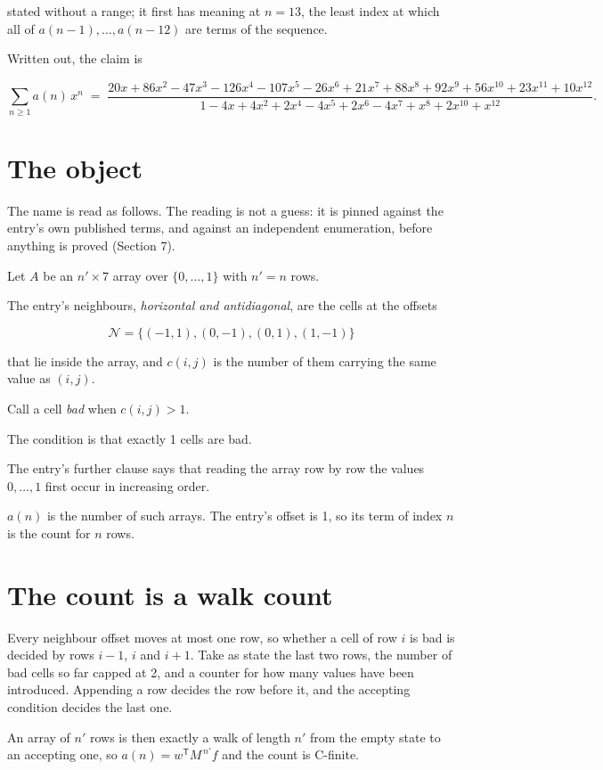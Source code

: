 \documentclass[11pt]{article}
\theoremstyle{definition}
\begin{document}
stated without a range; it first has meaning at $n = 13$, the least index at which all of $a(n-1),\dots,a(n-12)$ are terms of the sequence.

Written out, the claim is

\[\sum_{n \ge 1} a(n)\,x^n \;=\; \frac{20x + 86x^{2} - 47x^{3} - 126x^{4} - 107x^{5} - 26x^{6} + 21x^{7} + 88x^{8} + 92x^{9} + 56x^{10} + 23x^{11} + 10x^{12}}{1 - 4x + 4x^{2} + 2x^{4} - 4x^{5} + 2x^{6} - 4x^{7} + x^{8} + 2x^{10} + x^{12}}.\]

\section{The object}

The name is read as follows. The reading is not a guess: it is pinned against the entry's own published terms, and against an independent enumeration, before anything is proved (Section 7).

Let $A$ be an $n' \times 7$ array over $\{0,\dots,1\}$ with $n' = n$ rows.

The entry's neighbours, {\itshape horizontal and antidiagonal}, are the cells at the offsets

\[\mathcal{N} = \{(-1,1), (0,-1), (0,1), (1,-1)\}\]

that lie inside the array, and $c(i,j)$ is the number of them carrying the same value as $(i,j)$.

Call a cell {\itshape bad} when $c(i,j) > 1$.

The condition is that exactly 1 cells are bad.

The entry's further clause says that reading the array row by row the values $0,\dots,1$ first occur in increasing order.

$a(n)$ is the number of such arrays. The entry's offset is 1, so its term of index $n$ is the count for $n$ rows.

\section{The count is a walk count}

Every neighbour offset moves at most one row, so whether a cell of row $i$ is bad is decided by rows $i-1$, $i$ and $i+1$. Take as state the last two rows, the number of bad cells so far capped at 2, and a counter for how many values have been introduced. Appending a row decides the row before it, and the accepting condition decides the last one.

An array of $n'$ rows is then exactly a walk of length $n'$ from the empty state to an accepting one, so $a(n) = w^{\mathsf T}M^{\,n'}f$ and the count is C-finite.
\end{document}
